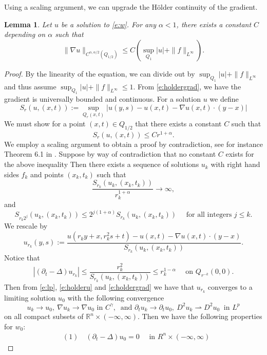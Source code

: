 \documentclass{amsart}
\newtheorem{lemma}[theorem]{Lemma}
\numberwithin{equation}{section}
\begin{document}
Using a scaling argument, we can upgrade the H\"older continuity of the gradient. 
\begin{lemma} \label{l:holderspace}
 Let $u$ be a solution to \eqref{e:w}.  For any $\alpha<1$, there exists a constant $C$ depending on $\alpha$ such that 
 \[
 \| \nabla u \|_{C^{\alpha,\alpha/2}(Q_{1/2})} \leq C (\sup_{Q_1}|u| +\|f\|_{L^{\infty}}). 
 \]
\end{lemma}

\begin{proof} 
By the linearity of the equation, we can divide out by $\displaystyle \sup_{Q_1}|u| + \| f \|_{L^{\infty}}$ and thus assume $\displaystyle\sup_{Q_1}|u| + \| f \|_{L^{\infty}}\leq 1$.
 From \eqref{e:holdergrad}, we have the gradient is universally bounded and continuous. 
  For a solution $u$ we define
 \[
 S_r(u,(x,t)):= \sup_{Q_r(x,t)} |u(y,s)-u(x,t)-\nabla u(x,t) \cdot (y-x)|
 \]
  We must show for a point $(x,t) \in Q_{1/2}$ that there exists a constant $C$ such that 
 \[
  S_r(u,(x,t))\leq Cr^{1+\alpha}.   
 \]
 We employ a scaling argument to obtain a proof by contradiction, see for instance Theorem 6.1 in \cite{alp15}. Suppose by way of contradiction that no constant $C$ exists for the above inequality Then there exists a sequence of solutions $u_k$ with right hand sides $f_k$ and points $(x_k,t_k)$ such that 
 \[
 \frac{S_{r_k}(u_k, (x_k,t_k))}{r_k^{1+\alpha}} \to \infty,
 \]
 and 
 \begin{equation} \label{e:liouville}
 S_{r_k 2^j}(u_k,(x_k,t_k))\leq 2^{j(1+\alpha)}S_{r_k}(u_k,(x_k,t_k)) \quad \text{ for all integers } j\leq k. 
 \end{equation}
 We rescale by 
 \[
 u_{r_k}(y,s):= \frac{u(r_ky+x,r_k^2s+t)-u(x,t)-\nabla u(x,t)\cdot(y-x)}{S_{r_k}(u_k,(x_k,t_k))}.
 \]
 Notice that 
 \begin{equation} \label{e:caloric}
 |(\partial_t - \Delta) u_{r_k}|\leq \frac{r_k^2}{S_{r_k}(u_k,(x_k,t_k))}\leq r_k^{1-\alpha} \quad \text{ on } Q_{r^{-k}}(0,0). 
 \end{equation}
 Then from \eqref{e:lp}, \eqref{e:holderu} and \eqref{e:holdergrad} we have that $u_{r_k}$ converges to a limiting solution $u_0$ with the following convergence 
 \[
 u_k \to u_0, \ \nabla u_k \to \nabla u_0 \text{ in } C^{\gamma}, \ \text{ and }  \partial_t u_k \to \partial_t u_0, \  D^2 u_k \rightharpoonup D^2 u_0 \ \text{ in } L^p
 \]
 on all compact subsets of $\mathbb{R}^{n} \times (-\infty,\infty)$. Then we have the following properties for $w_0$:
 \[
 \begin{aligned}
  &(1)\quad (\partial_t-\Delta)u_0 = 0 \quad \text{ in } R^n \times (-\infty,\infty)

\end{aligned}\]
\end{proof}
\end{document}

